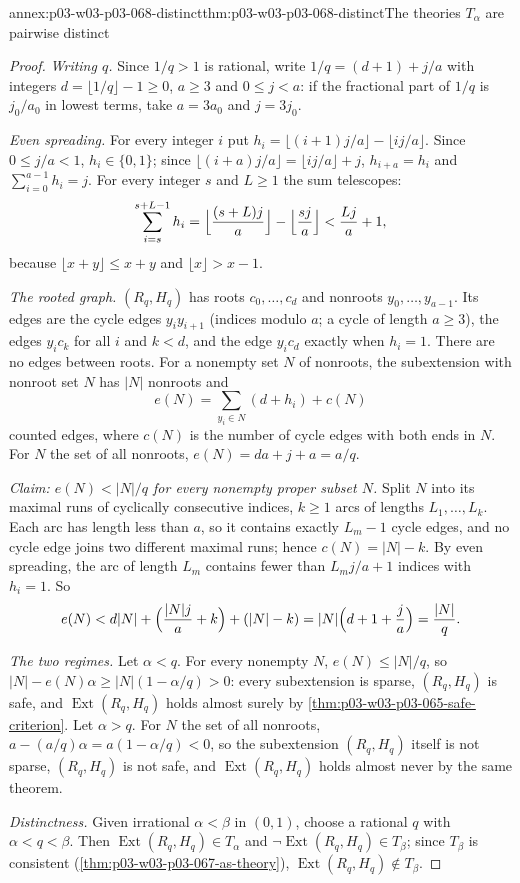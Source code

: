\begin{annexitem}{annex:p03-w03-p03-068-distinct}{thm:p03-w03-p03-068-distinct}{The theories \(T_\alpha\) are pairwise distinct}
\begin{proof}
\emph{Writing \(q\).}  Since \(1/q>1\) is rational, write
\(1/q=(d+1)+j/a\) with integers \(d=\lfloor1/q\rfloor-1\geq0\), \(a\geq3\) and
\(0\leq j<a\): if the fractional part of \(1/q\) is \(j_0/a_0\) in lowest terms,
take \(a=3a_0\) and \(j=3j_0\).

\emph{Even spreading.}  For every integer \(i\) put
\(h_i=\lfloor(i+1)j/a\rfloor-\lfloor ij/a\rfloor\).  Since \(0\leq j/a<1\),
\(h_i\in\{0,1\}\); since \(\lfloor(i+a)j/a\rfloor=\lfloor ij/a\rfloor+j\),
\(h_{i+a}=h_i\) and \(\sum_{i=0}^{a-1}h_i=j\).  For every integer \(s\) and
\(L\geq1\) the sum telescopes:
\[
  \sum_{i=s}^{s+L-1}h_i=\Bigl\lfloor\frac{(s+L)j}a\Bigr\rfloor
  -\Bigl\lfloor\frac{sj}a\Bigr\rfloor<\frac{Lj}a+1,
\]
because \(\lfloor x+y\rfloor\leq x+y\) and \(\lfloor x\rfloor>x-1\).

\emph{The rooted graph.}  \((R_q,H_q)\) has roots \(c_0,\ldots,c_d\) and
nonroots \(y_0,\ldots,y_{a-1}\).  Its edges are the cycle edges
\(y_iy_{i+1}\) (indices modulo \(a\); a cycle of length \(a\geq3\)), the edges
\(y_ic_k\) for all \(i\) and \(k<d\), and the edge \(y_ic_d\) exactly when
\(h_i=1\).  There are no edges between roots.  For a nonempty set
\(N\) of nonroots, the subextension with nonroot set \(N\) has
\(|N|\) nonroots and
\[
  e(N)=\sum_{y_i\in N}(d+h_i)+c(N)
\]
counted edges, where \(c(N)\) is the number of cycle edges with both ends in
\(N\).  For \(N\) the set of all nonroots, \(e(N)=da+j+a=a/q\).

\emph{Claim: \(e(N)<|N|/q\) for every nonempty proper subset \(N\).}  Split
\(N\) into its maximal runs of cyclically consecutive indices, \(k\geq1\) arcs
of lengths \(L_1,\ldots,L_k\).  Each arc has length less than \(a\), so it
contains exactly \(L_m-1\) cycle edges, and no cycle edge joins two different
maximal runs; hence \(c(N)=|N|-k\).  By even spreading, the arc of length
\(L_m\) contains fewer than \(L_mj/a+1\) indices with \(h_i=1\).  So
\[
  e(N)<d|N|+\Bigl(\frac{|N|j}a+k\Bigr)+(|N|-k)=|N|\Bigl(d+1+\frac ja\Bigr)
  =\frac{|N|}q .
\]

\emph{The two regimes.}  Let \(\alpha<q\).  For every nonempty \(N\),
\(e(N)\leq|N|/q\), so \(|N|-e(N)\alpha\geq|N|(1-\alpha/q)>0\): every
subextension is sparse, \((R_q,H_q)\) is safe, and
\(\operatorname{Ext}(R_q,H_q)\) holds almost surely by
\cref{thm:p03-w03-p03-065-safe-criterion}.  Let \(\alpha>q\).  For \(N\) the
set of all nonroots, \(a-(a/q)\alpha=a(1-\alpha/q)<0\), so the subextension
\((R_q,H_q)\) itself is not sparse, \((R_q,H_q)\) is not safe, and
\(\operatorname{Ext}(R_q,H_q)\) holds almost never by the same theorem.

\emph{Distinctness.}  Given irrational \(\alpha<\beta\) in \((0,1)\), choose a
rational \(q\) with \(\alpha<q<\beta\).  Then \(\operatorname{Ext}(R_q,H_q)\in
T_\alpha\) and \(\neg\operatorname{Ext}(R_q,H_q)\in T_\beta\); since
\(T_\beta\) is consistent (\cref{thm:p03-w03-p03-067-as-theory}),
\(\operatorname{Ext}(R_q,H_q)\notin T_\beta\).
\end{proof}
\end{annexitem}

